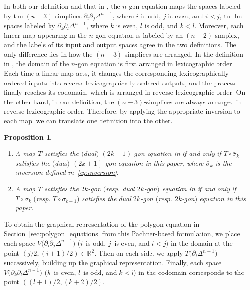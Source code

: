 \documentclass[10pt,a4paper]{amsart}
\numberwithin{equation}{section}
\newtheorem{Proposition}[Theorem]{Proposition}
\theoremstyle{definition}
\begin{document}
In both our definition and that in \cite{dimakis2015simplex}, the $n$-gon equation maps the spaces labeled by the $(n-3)$-simplices $\partial_i\partial_j\Delta^{n-1}$, where $i$ is odd, $j$ is even, and $i<j$, to the spaces labeled by $\partial_k\partial_l\Delta^{n-1}$, where $k$ is even, $l$ is odd, and $k<l$. Moreover, each linear map appearing in the $n$\nobreakdash-gon equation is labeled by an $(n-2)$-simplex, and the labels of its input and output spaces agree in the two definitions.
The only difference lies in how the $(n-3)$-simplices are arranged.
In the definition in \cite{dimakis2015simplex}, the domain of the $n$-gon equation is first arranged in lexicographic order. Each time a linear map acts, it changes the corresponding lexicographically ordered inputs into reverse lexicographically ordered outputs, and the process finally reaches its codomain, which is arranged in reverse lexicographic order. On the other hand, in our definition, the $(n-3)$-simplices are always arranged in reverse lexicographic order. Therefore, by applying the appropriate inversion to each map, we can translate one definition into the other. %
\begin{Proposition}\quad\samepage
 \begin{enumerate}\itemsep=0pt
 \item[$(1)$] A map $T$ satisfies the $($dual$)$ $(2k+1)$-gon equation in {\rm \cite{dimakis2015simplex}} if and only if $T\circ\bar{\sigma}_k$ satisfies the $($dual$)$ $(2k+1)$-gon equation in this paper, where $\bar{\sigma}_k$ is the inversion defined in~\eqref{eq:inversion}.
 \item[$(2)$] A map $T$ satisfies the $2k$-gon $($resp. dual $2k$-gon$)$ equation in {\rm \cite{dimakis2015simplex}} if and only if $T\circ\bar{\sigma}_k$ $($resp. $T\circ\bar{\sigma}_{k-1})$ satisfies the dual $2k$-gon $($resp. $2k$-gon$)$ equation in this paper.
 \end{enumerate}
\end{Proposition}


To obtain the graphical representation of the polygon equation in Section~\ref{sec:polygon_equations} from this Pachner-based formulation, we place each space $V\bigl(\partial_i\partial_j\Delta^{n-1}\bigr)$ ($i$~is odd, $j$~is even, and $i<j$) in the domain at the point $(j/2, (i+1)/2)\in\mathbb{R}^2$. Then on each side, we apply $T\bigl(\partial_i\Delta^{n-1}\bigr)$ successively, building up the graphical representation. Finally, each space $V\bigl(\partial_k\partial_l\Delta^{n-1}\bigr)$ ($k$~is even, $l$~is odd, and $k<l$) in the codomain corresponds to the point $((l+1)/2,(k+2)/2)$.
\end{document}
